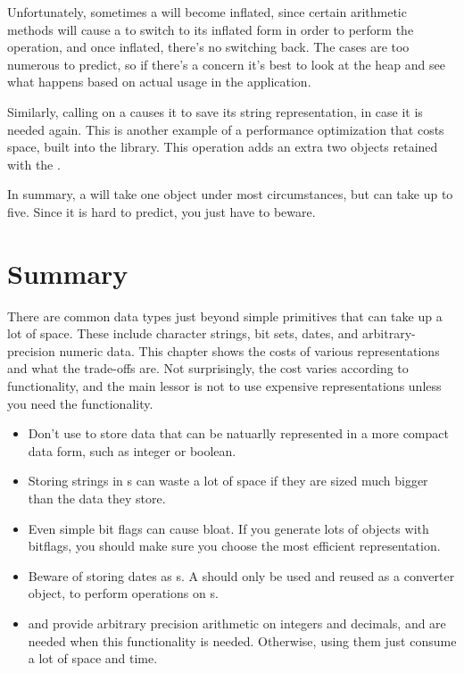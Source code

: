 Unfortunately, sometimes a  will become inflated,
since certain arithmetic methods will cause a  to switch to its inflated form in order to perform the operation, and once inflated,
there's no switching back.  The cases are too numerous to predict, so if there's
a concern it's best to look at the heap and see what happens based on actual usage in the 
application.

Similarly, calling  on a  causes it to
save its string representation, in case it is needed again.
This is another example of a performance optimization that 
costs space, built into the library.  This operation adds an extra two objects
retained with the . 

In summary, a  will take one
object under most circumstances, but can take up to five. Since it is hard to
predict, you just have to beware.

\section{Summary} 

There are common data types just beyond simple primitives that can
take up a lot of space.  These include character strings, bit sets, dates, and
arbitrary-precision numeric data. This chapter shows the costs of various
representations and what the trade-offs are. Not surprisingly, the cost varies
according to functionality, and the main lessor is not to use expensive
representations unless you need the functionality.

\begin{itemize}
  \item  Don't use  to store data that can be natuarlly
  represented in a more compact data form, such as integer or boolean.
  \item Storing strings in s can waste a lot of space
  if they are sized much bigger than the data they store.
  \item Even simple bit flags can cause bloat. If you generate lots of objects
  with bitflags, you should make sure you choose the most efficient
  representation.
  \item Beware of storing dates as s.  A
   should only be used and reused as a converter
  object, to perform operations on s.
  \item {} and  provide arbitrary precision
  arithmetic on integers and decimals, and are needed when this functionality is
  needed. Otherwise, using them just consume a lot of space and time.
\end{itemize}









